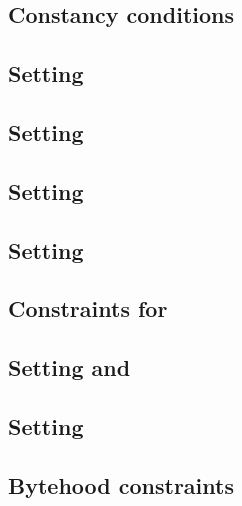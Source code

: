 \subsection{Constancy conditions}                                           \label{bls: counter constancies}                                
\subsection{Setting \blsPhase{}}                                            \label{bls: setting phase}                                      
\subsection{Setting \indexMax{}}                                            \label{bls: setting index max}                                  
\subsection{Setting \blsIndex{}}                                            \label{bls: setting index}                                      
\subsection{Setting           \maxCt{}}                                     \label{bls: setting ct_max}                                     
\subsection{Constraints for \ct{}}                                          \label{bls: setting ct}                                         
\subsection{Setting \isFirstInput{} and \isSecondInput{}}                   \label{bls: setting is_first and is_second}                     
\subsection{Setting \accInputs{}}                                           \label{bls: setting acc pairings}                               
\subsection{Bytehood constraints}                                           \label{bls: bytehood and accumulator}                           

